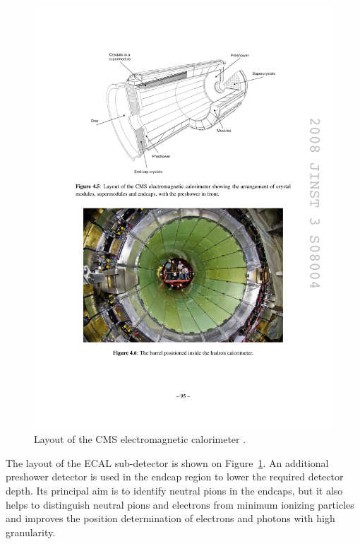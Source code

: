 \begin{figure}[!htbp]
  \begin{center}
    \leavevmode
    \includegraphics[width=\columnwidth]{ECAL}
    \caption{Layout of the CMS electromagnetic calorimeter \cite{CMS}.}
    \label{ECAL}
  \end{center}
\end{figure}

The layout of the ECAL sub-detector is shown on Figure~\ref{ECAL}. An additional preshower detector is used in the
endcap region to lower the required detector depth. Its principal aim is to identify neutral pions in the endcaps, but
it also helps to distinguish neutral pions and electrons from minimum ionizing particles and improves the position
determination of electrons and photons with high granularity.

